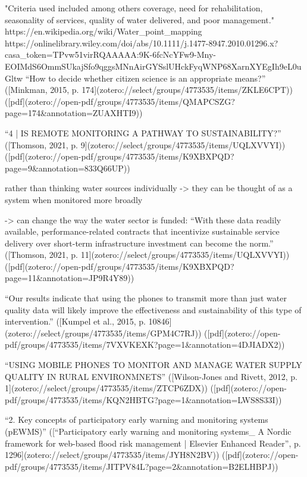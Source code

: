 "Criteria used included among others coverage, need for rehabilitation, seasonality of services, quality of water delivered, and poor management." https://en.wikipedia.org/wiki/Water_point_mapping
https://onlinelibrary.wiley.com/doi/abs/10.1111/j.1477-8947.2010.01296.x?casa_token=TPvw51virRQAAAAA:9K-6fcNcYFw9-Mny-EOIMdS6OmmSUkajSfo9qggsMNnAirGYSslUHckFyqWNP68XarnXYEgIh9eL0uGltw
“How to decide whether citizen science is an appropriate means?” ([Minkman, 2015, p. 174](zotero://select/groups/4773535/items/ZKLE6CPT)) ([pdf](zotero://open-pdf/groups/4773535/items/QMAPCSZG?page=174&annotation=ZUAXHTI9))

“4 | IS REMOTE MONITORING A PATHWAY TO SUSTAINABILITY?” ([Thomson, 2021, p. 9](zotero://select/groups/4773535/items/UQLXVVYI)) ([pdf](zotero://open-pdf/groups/4773535/items/K9XBXPQD?page=9&annotation=833Q66UP))

rather than thinking water sources individually -> they can be thought of as a system when monitored more broadly

-> can change the way the water sector is funded: “With these data readily available, performance-related contracts that incentivize sustainable service delivery over short-term infrastructure investment can become the norm.” ([Thomson, 2021, p. 11](zotero://select/groups/4773535/items/UQLXVVYI)) ([pdf](zotero://open-pdf/groups/4773535/items/K9XBXPQD?page=11&annotation=JP9R4Y89))

“Our results indicate that using the phones to transmit more than just water quality data will likely improve the effectiveness and sustainability of this type of intervention.” ([Kumpel et al., 2015, p. 10846](zotero://select/groups/4773535/items/GPM4C7RJ)) ([pdf](zotero://open-pdf/groups/4773535/items/7VXVKEXK?page=1&annotation=4DJIADX2))

“USING MOBILE PHONES TO MONITOR AND MANAGE WATER SUPPLY QUALITY IN RURAL ENVIRONMNETS” ([Wilson-Jones and Rivett, 2012, p. 1](zotero://select/groups/4773535/items/ZTCP6ZDX)) ([pdf](zotero://open-pdf/groups/4773535/items/KQN2HBTG?page=1&annotation=LWS8S33I))



“2. Key concepts of participatory early warning and monitoring systems (pEWMS)” ([“Participatory early warning and monitoring systems_ A Nordic framework for web-based flood risk management | Elsevier Enhanced Reader”, p. 1296](zotero://select/groups/4773535/items/JYH8N2BV)) ([pdf](zotero://open-pdf/groups/4773535/items/JITPV84L?page=2&annotation=B2ELHBPJ))

